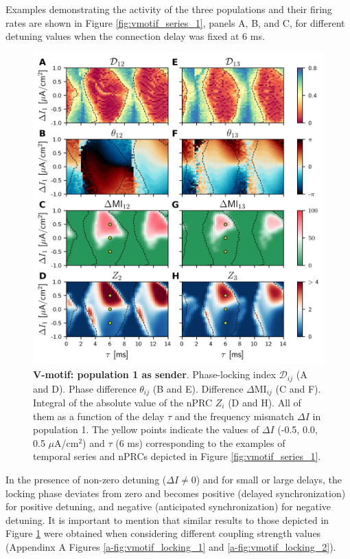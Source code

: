 \documentclass[../main.tex]{subfiles}
\begin{document}
Examples demonstrating the activity of the three populations and their firing rates are shown in Figure \ref{fig:vmotif_series_1}, panels A, B, and C, for different detuning values when the connection delay was fixed at 6 ms.
\begin{figure}[!htb]
 \centering
    \includegraphics[width=\textwidth]{chapter2/figures/fig2}
    \caption{\textbf{V-motif: population 1 as sender}.
    Phase-locking index $\mathcal{D}_{ij}$ (A and D).
    Phase difference $\theta_{ij}$ (B and E). Difference $\Delta$MI$_{ij}$ (C and F).
    Integral of the absolute value of the nPRC $Z_i$ (D and H).
    All of them as a function of the delay $\tau$ and the frequency mismatch $\Delta I$ in population 1.
    The yellow points indicate the values of $\Delta I$ (-0.5, 0.0, 0.5 $\mu$A/cm$^2$) and $\tau$ (6 ms) corresponding to the examples of temporal series and nPRCs depicted in Figure \ref{fig:vmotif_series_1}.}
    \label{fig:vmotif_signal_1}
\end{figure} 
In the presence of non-zero detuning ($\Delta I \ne 0$) and for small or large delays, the locking phase deviates from zero and becomes positive (delayed synchronization) for positive detuning, and negative (anticipated synchronization) for negative detuning.
It is important to mention that similar results to those depicted in Figure \ref{fig:vmotif_signal_1} were obtained when considering different coupling strength values (Appendinx A Figures \ref{a-fig:vmotif_locking_1} and \ref{a-fig:vmotif_locking_2}).
\end{document}
